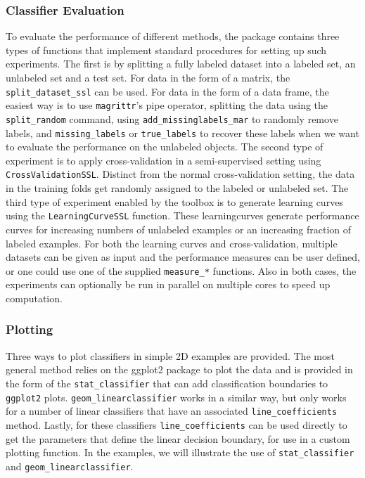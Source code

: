 \documentclass[runningheads,a4paper]{llncs}\usepackage[]{graphicx}\usepackage[]{color}
\begin{document}
\subsubsection{Classifier Evaluation}
To evaluate the performance of different methods, the package contains three types of functions that implement standard procedures for setting up such experiments. The first is by splitting a fully labeled dataset into a labeled set, an unlabeled set and a test set. For data in the form of a matrix, the \texttt{split\_dataset\_ssl} can be used. For data in the form of a data frame, the easiest way is to use \texttt{magrittr}'s pipe operator, splitting the data using the \texttt{split\_random} command, using \texttt{add\_missinglabels\_mar} to randomly remove labels, and \texttt{missing\_labels} or \texttt{true\_labels} to recover these labels when we want to evaluate the performance on the unlabeled objects.
The second type of experiment is to apply cross-validation in a semi-supervised setting using \texttt{CrossValidationSSL}. Distinct from the normal cross-validation setting, the data in the training folds get randomly assigned to the labeled or unlabeled set.
The third type of experiment enabled by the toolbox is to generate learning curves using the \texttt{LearningCurveSSL} function. These learningcurves generate performance curves for increasing numbers of unlabeled examples or an increasing fraction of labeled examples. 
For both the learning curves and cross-validation, multiple datasets can be given as input and the performance measures can be user defined, or one could use one of the supplied \texttt{measure\_*} functions. Also in both cases, the experiments can optionally be run in parallel on multiple cores to speed up computation.

\subsubsection{Plotting}
Three ways to plot classifiers in simple 2D examples are provided. The most general method relies on the ggplot2 package \cite{Wickham2009} to plot the data and is provided in the form of the \texttt{stat\_classifier} that can add  classification boundaries to \texttt{ggplot2} plots. \texttt{geom\_linearclassifier} works in a similar way, but only works for a number of linear classifiers that have an associated \texttt{line\_coefficients} method. Lastly, for these classifiers \texttt{line\_coefficients} can be used directly to get the parameters that define the linear decision boundary, for use in a custom plotting function. In the examples, we will illustrate the use of \texttt{stat\_classifier} and \texttt{geom\_linearclassifier}.
\end{document}
